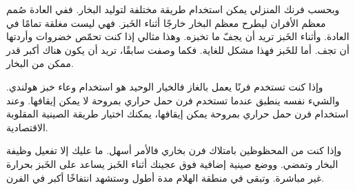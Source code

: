 وبحسب فرنك المنزلي يمكن استخدام طريقة مختلفة لتوليد البخار. ففي العادة صُمم معظم الأفران ليطرح معظم البخار خارجًا أثناء الخَبز. فهي ليست مغلقة تمامًا في العادة. وأثناء الخَبز تريد أن يجفّ ما تخبزه. وهذا مثالي إذا كنت تحمّص خضروات وأردتها أن تجف. أما للخَبز فهذا مشكل للغاية. فكما وصفت سابقًا، تريد أن يكون هناك أكبر قدر ممكن من البخار.

وإذا كنت تستخدم فرنًا يعمل بالغاز فالخيار الوحيد هو استخدام وعاء خبز هولندي. والشيء نفسه ينطبق عندما تستخدم فرن حمل حراري بمروحة لا يمكن إيقافها. وعند استخدام فرن حمل حراري بمروحة يمكن إيقافها، يمكنك اختيار طريقة الصينية المقلوبة الاقتصادية.

وإذا كنت من المحظوظين بامتلاك فرن بخاري فالأمر أسهل. ما عليك إلا تفعيل وظيفة البخار وتمضي. ووضع صينية إضافية فوق عجينك أثناء الخَبز يساعد على الخَبز بحرارة غير مباشرة. وتبقى في منطقة الهلام مدة أطول وستشهد انتفاخًا أكبر في الفرن.
